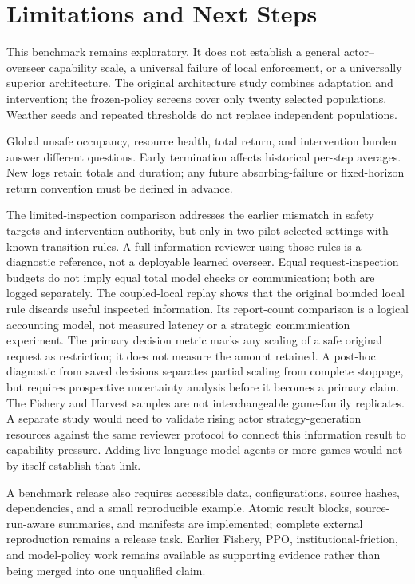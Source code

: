 \documentclass[10pt]{article}
\begin{document}
\section{Limitations and Next Steps}
This benchmark remains exploratory. It does not establish a general actor--overseer capability scale, a universal failure of local enforcement, or a universally superior architecture. The original architecture study combines adaptation and intervention; the frozen-policy screens cover only twenty selected populations. Weather seeds and repeated thresholds do not replace independent populations.

Global unsafe occupancy, resource health, total return, and intervention burden answer different questions. Early termination affects historical per-step averages. New logs retain totals and duration; any future absorbing-failure or fixed-horizon return convention must be defined in advance.

The limited-inspection comparison addresses the earlier mismatch in safety targets and intervention authority, but only in two pilot-selected settings with known transition rules. A full-information reviewer using those rules is a diagnostic reference, not a deployable learned overseer. Equal request-inspection budgets do not imply equal total model checks or communication; both are logged separately. The coupled-local replay shows that the original bounded local rule discards useful inspected information. Its report-count comparison is a logical accounting model, not measured latency or a strategic communication experiment. The primary decision metric marks any scaling of a safe original request as restriction; it does not measure the amount retained. A post-hoc diagnostic from saved decisions separates partial scaling from complete stoppage, but requires prospective uncertainty analysis before it becomes a primary claim. The Fishery and Harvest samples are not interchangeable game-family replicates. A separate study would need to validate rising actor strategy-generation resources against the same reviewer protocol to connect this information result to capability pressure. Adding live language-model agents or more games would not by itself establish that link.

A benchmark release also requires accessible data, configurations, source hashes, dependencies, and a small reproducible example. Atomic result blocks, source-run-aware summaries, and manifests are implemented; complete external reproduction remains a release task. Earlier Fishery, PPO, institutional-friction, and model-policy work remains available as supporting evidence rather than being merged into one unqualified claim.
\end{document}
